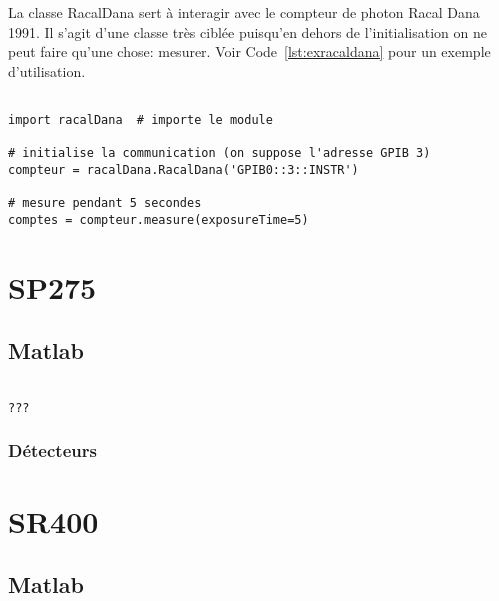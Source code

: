 \documentclass[11pt,francais]{book} %
\begin{document}
La classe RacalDana sert à interagir avec le compteur de photon Racal Dana 1991.
Il s'agit d'une classe très ciblée puisqu'en dehors de l'initialisation on ne peut faire qu'une chose: mesurer.
Voir Code~\ref{lst:exracaldana} pour un exemple d'utilisation.

\begin{lstlisting}[frame=single,caption={Exemple d'utilisation de {\it RacalDana avec Python}},label={lst:exracaldana},breaklines=true,]  % Start your code-block
 
import racalDana  # importe le module

# initialise la communication (on suppose l'adresse GPIB 3)
compteur = racalDana.RacalDana('GPIB0::3::INSTR') 

# mesure pendant 5 secondes
comptes = compteur.measure(exposureTime=5)
\end{lstlisting}


\section{SP275}

\subsection{Matlab}

\begin{lstlisting}[frame=single,caption={Exemple d'utilisation du SP275 avec Matlab},label={lst:exsp275},breaklines=true,]  % Start your code-block

???
\end{lstlisting}

\subsubsection{Détecteurs}


\section{SR400}

\subsection{Matlab}
\end{document}
